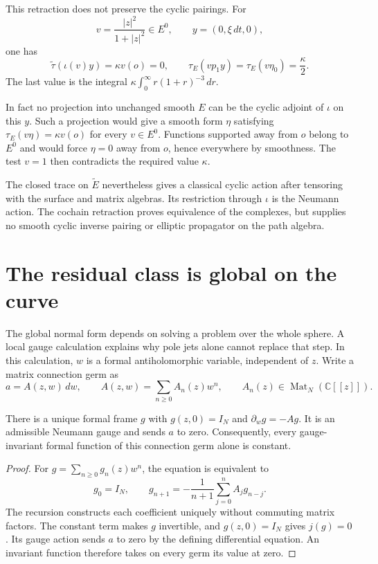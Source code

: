 \begin{example}\label{mht:ex:path-adjoint-defect}
This retraction does not preserve the cyclic pairings. For
\[
 v=\frac{|z|^2}{1+|z|^2}\in E^0,
 \qquad y=(0,\xi\,dt,0),
\]
one has
\[
 \widetilde\tau(\iota(v)y)=\kappa v(o)=0,\qquad
 \tau_E(vp_1y)=\tau_E(v\eta_0)=\frac\kappa2.
\]
The last value is the integral
$\kappa\int_0^\infty r(1+r)^{-3}\,dr$.
\end{example}

In fact no projection into unchanged smooth $E$ can be the cyclic
adjoint of $\iota$ on this $y$. Such a projection would give a smooth
form $\eta$ satisfying $\tau_E(v\eta)=\kappa v(o)$ for every
$v\in E^0$. Functions supported away from $o$ belong to $E^0$ and
would force $\eta=0$ away from $o$, hence everywhere by smoothness.
The test $v=1$ then contradicts the required value $\kappa$.

The closed trace on $\widetilde E$ nevertheless gives a classical
cyclic action after tensoring with the surface and matrix algebras.
Its restriction through $\iota$ is the Neumann action. The cochain
retraction proves equivalence of the complexes, but supplies no smooth
cyclic inverse pairing or elliptic propagator on the path algebra.

\section{The residual class is global on the curve}

The global normal form depends on solving a problem over the whole
sphere. A local gauge calculation explains why pole jets alone cannot
replace that step. In this calculation, $w$ is a formal
antiholomorphic variable, independent of $z$. Write a matrix connection
germ as
\[
 a=A(z,w)\,dw,\qquad A(z,w)=\sum_{n\geq0}A_n(z)w^n,
 \qquad A_n(z)\in\operatorname{Mat}_N(\mathbb C[[z]]).
\]

\begin{proposition}\label{mht:prop:local-curve-frame}
There is a unique formal frame $g$ with $g(z,0)=I_N$ and
$\partial_wg=-Ag$. It is an admissible Neumann gauge and sends $a$
to zero. Consequently, every gauge-invariant formal function of this
connection germ alone is constant.
\end{proposition}

\begin{proof}
For $g=\sum_{n\geq0}g_n(z)w^n$, the equation is equivalent to
\begin{equation}\label{mht:eq:local-frame-recursion}
 g_0=I_N,\qquad
 g_{n+1}=-\frac1{n+1}\sum_{j=0}^n A_jg_{n-j}.
\end{equation}
The recursion constructs each coefficient uniquely without commuting
matrix factors. The constant term makes $g$ invertible, and
$g(z,0)=I_N$ gives $j(g)=0$. Its gauge action sends $a$ to zero by
the defining differential equation. An invariant function therefore
takes on every germ its value at zero.
\end{proof}

